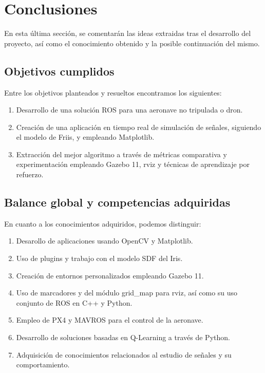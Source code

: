 \chapter{Conclusiones}
\label{cap:capitulo5}

En esta última sección, se comentarán las ideas extraidas tras el desarrollo del proyecto, así como el conocimiento obtenido y la posible continuación del mismo.\\

\section{Objetivos cumplidos}
\label{sec:objetivos_cumplidos}

Entre los objetivos planteados y resueltos encontramos los siguientes:\\

\begin{enumerate}
    \item Desarrollo de una solución \ac{ROS} para una aeronave no tripulada o dron.
    
    \item Creación de una aplicación en tiempo real de simulación de señales, siguiendo el modelo de Friis, y empleando Matplotlib.
    
    \item Extracción del mejor algoritmo a través de métricas comparativa y experimentación empleando Gazebo 11, rviz y técnicas de aprendizaje por refuerzo.
\end{enumerate}

\section{Balance global y competencias adquiridas}
\label{sec:balance_global_competencias_adquiridas}

En cuanto a los conocimientos adquiridos, podemos distinguir:\\

\begin{enumerate}
    \item Desarollo de aplicaciones usando OpenCV y Matplotlib.
    
    \item Uso de plugins y trabajo con el modelo SDF del Iris.
    
    \item Creación de entornos personalizados empleando Gazebo 11.
    
    \item Uso de marcadores y del módulo grid\_map para rviz, así como su uso conjunto de ROS en C++ y Python.
    
    \item Empleo de PX4 y MAVROS para el control de la aeronave.
    
    \item Desarrollo de soluciones basadas en Q-Learning a través de Python.
    
    \item Adquisición de conocimientos relacionados al estudio de señales y su comportamiento.
\end{enumerate}

